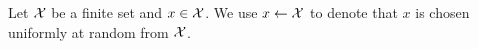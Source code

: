 Let $\mathcal{X}$ be a finite set and $x \in \mathcal{X}$.
We use $x \leftarrow \mathcal{X}$ to denote that $x$ is chosen uniformly at random from $\mathcal{X}$.



